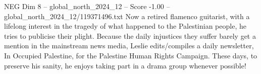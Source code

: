 \begin{textsample}{NEG Dim 8 – global\_north\_2024\_12 – Score -1.00 – global\_north\_2024\_12/119371496.txt}
Now a retired flamenco guitarist, with a lifelong interest in the tragedy of what happened to the Palestinian people, he tries to publicise their plight.
Because the daily injustices they suffer barely get a mention in the mainstream news media, Leslie edits/compiles a daily newsletter, In Occupied Palestine, for the Palestine Human Rights Campaign.
These days, to preserve his sanity, he enjoys taking part in a drama group whenever possible!

\end{textsample}
